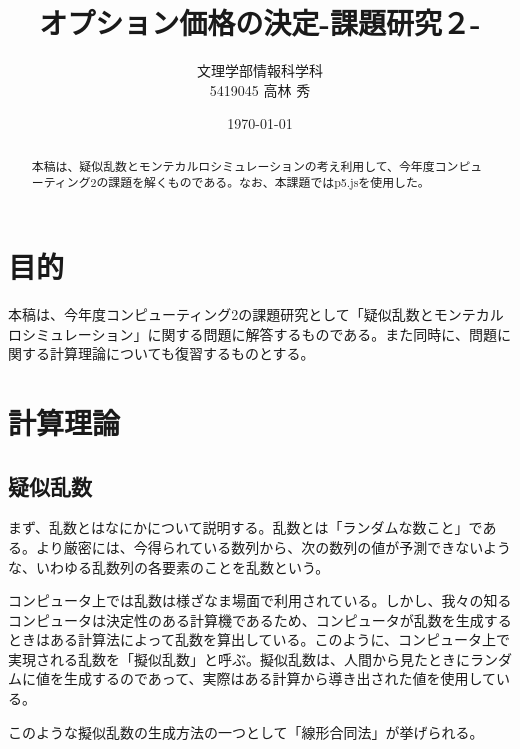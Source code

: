 \documentclass[dvipdfmx]{jsarticle}
\title{オプション価格の決定-課題研究２-}
\author{文理学部情報科学科\\5419045 高林 秀}
\date{\today}
\begin{document}
\maketitle

\begin{abstract}
本稿は、疑似乱数とモンテカルロシミュレーションの考え利用して、今年度コンピューティング2の課題を解くものである。なお、本課題ではp5.jsを使用した。
\end{abstract}

\section{目的}
本稿は、今年度コンピューティング2の課題研究として「疑似乱数とモンテカルロシミュレーション」に関する問題に解答するものである。また同時に、問題に関する計算理論についても復習するものとする。
\section{計算理論}
\subsection{疑似乱数}
まず、乱数とはなにかについて説明する。乱数とは「ランダムな数こと」である。より厳密には、今得られている数列から、次の数列の値が予測できないような、いわゆる乱数列の各要素のことを乱数という。\par
コンピュータ上では乱数は様ざなま場面で利用されている。しかし、我々の知るコンピュータは決定性のある計算機であるため、コンピュータが乱数を生成するときはある計算法によって乱数を算出している。このように、コンピュータ上で実現される乱数を「擬似乱数」と呼ぶ。擬似乱数は、人間から見たときにランダムに値を生成するのであって、実際はある計算から導き出された値を使用している。\par
このような擬似乱数の生成方法の一つとして「線形合同法」が挙げられる。
\end{document}

